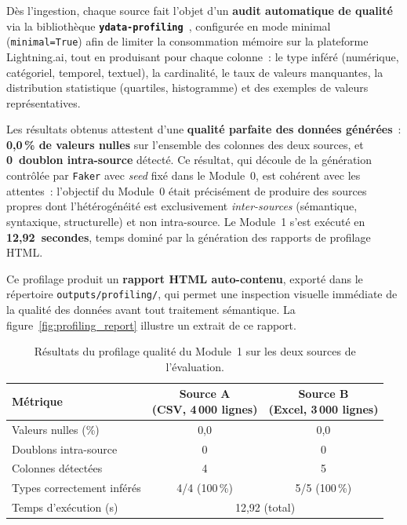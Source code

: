 Dès l'ingestion, chaque source fait l'objet d'un \textbf{audit
automatique de qualité} via la bibliothèque
\textbf{\texttt{ydata-profiling}}~\cite{ydataprofiling2023},
configurée en mode minimal (\texttt{minimal=True}) afin de limiter
la consommation mémoire sur la plateforme Lightning.ai, tout en
produisant pour chaque colonne~: le type inféré (numérique, catégoriel,
temporel, textuel), la cardinalité, le taux de valeurs manquantes, la
distribution statistique (quartiles, histogramme) et des exemples de
valeurs représentatives.

Les résultats obtenus attestent d'une \textbf{qualité parfaite des
données générées}~: \textbf{0,0\,\% de valeurs nulles} sur l'ensemble
des colonnes des deux sources, et \textbf{0~doublon intra-source}
détecté. Ce résultat, qui découle de la génération contrôlée par
\texttt{Faker} avec \textit{seed} fixé dans le Module~0, est cohérent
avec les attentes~: l'objectif du Module~0 était précisément de
produire des sources propres dont l'hétérogénéité est exclusivement
\textit{inter-sources} (sémantique, syntaxique, structurelle) et non
intra-source. Le Module~1 s'est exécuté en \textbf{12,92~secondes},
temps dominé par la génération des rapports de profilage HTML.

Ce profilage produit un \textbf{rapport HTML auto-contenu}, exporté
dans le répertoire \texttt{outputs/profiling/}, qui permet une
inspection visuelle immédiate de la qualité des données avant tout
traitement sémantique. La figure~\ref{fig:profiling_report} illustre
un extrait de ce rapport.

\begin{table}[h]
\centering
\caption{Résultats du profilage qualité du Module~1 sur les deux
         sources de l'évaluation.}
\label{tab:res_module1}
\begin{tabular}{lcc}
\hline
\textbf{Métrique}
& \makecell{\textbf{Source A}\\\textbf{(CSV, 4\,000 lignes)}}
& \makecell{\textbf{Source B}\\\textbf{(Excel, 3\,000 lignes)}} \\
\hline
Valeurs nulles (\%)        & 0,0           & 0,0           \\
Doublons intra-source      & 0             & 0             \\
Colonnes détectées         & 4             & 5             \\
Types correctement inférés & 4/4 (100\,\%) & 5/5 (100\,\%) \\
Temps d'exécution (s)      & \multicolumn{2}{c}{12,92 (total)} \\
\hline
\end{tabular}
\end{table}


